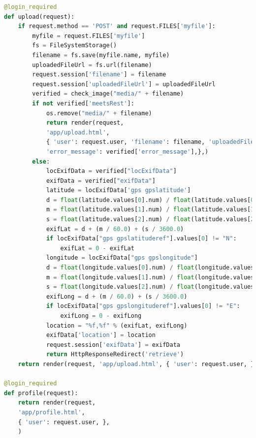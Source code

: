 \documentclass[onecolumn, draftclsnofoot,10pt, compsoc]{IEEEtran}
\begin{document}
\begin{flushleft}
\begin{lstlisting}[language=python]
@login_required
def upload(request):
    if request.method == 'POST' and request.FILES['myfile']:
        myfile = request.FILES['myfile']
        fs = FileSystemStorage()
        filename = fs.save(myfile.name, myfile)
        uploadedFileUrl = fs.url(filename)
        request.session['filename'] = filename
        request.session['uploadedFileUrl'] = uploadedFileUrl
        verified = check_image("media/" + filename)
        if not verified['meetsRest']:
            os.remove("media/" + filename)
            return render(request,
            'app/upload.html',
            { 'user': request.user, 'filename': filename, 'uploadedFileUrl': uploadedFileUrl,
            'error_message': verified['error_message'],},)
        else:
            locExifData = verified["locExifData"]
            exifData = verified["exifData"]
            latitude = locExifData['gps gpslatitude']
            d = float(latitude.values[0].num) / float(latitude.values[0].den)
            m = float(latitude.values[1].num) / float(latitude.values[1].den)
            s = float(latitude.values[2].num) / float(latitude.values[2].den)
            exifLat = d + (m / 60.0) + (s / 3600.0)
            if locExifData["gps gpslatituderef"].values[0] != "N":
                exifLat = 0 - exifLat
            longitude = locExifData["gps gpslongitude"]
            d = float(longitude.values[0].num) / float(longitude.values[0].den)
            m = float(longitude.values[1].num) / float(longitude.values[1].den)
            s = float(longitude.values[2].num) / float(longitude.values[2].den)
            exifLong = d + (m / 60.0) + (s / 3600.0)
            if locExifData["gps gpslongituderef"].values[0] != "E":
                exifLong = 0 - exifLong
            location = "%f,%f" % (exifLat, exifLong)
            exifData['location'] = location
            request.session['exifData'] = exifData
            return HttpResponseRedirect('retrieve')
    return render(request, 'app/upload.html', { 'user': request.user, },)
 
@login_required
def profile(request):
    return render(request,
    'app/profile.html',
    { 'user': request.user, },
    )
 

\end{lstlisting}
\end{flushleft}
\end{document}
